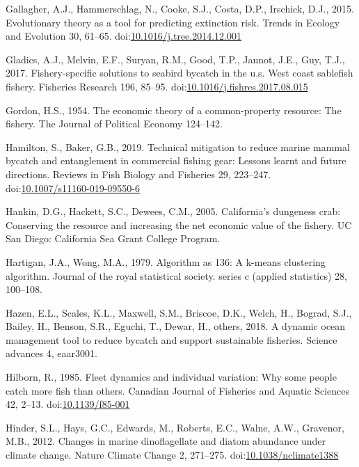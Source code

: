 \documentclass[]{elsarticle} %
\begin{document}
\leavevmode\hypertarget{ref-Gallagher2015}{}%
Gallagher, A.J., Hammerschlag, N., Cooke, S.J., Costa, D.P., Irschick,
D.J., 2015. Evolutionary theory as a tool for predicting extinction
risk. Trends in Ecology and Evolution 30, 61--65.
doi:\href{https://doi.org/10.1016/j.tree.2014.12.001}{10.1016/j.tree.2014.12.001}

\leavevmode\hypertarget{ref-Gladics2017}{}%
Gladics, A.J., Melvin, E.F., Suryan, R.M., Good, T.P., Jannot, J.E.,
Guy, T.J., 2017. Fishery-specific solutions to seabird bycatch in the
u.s. West coast sablefish fishery. Fisheries Research 196, 85--95.
doi:\href{https://doi.org/10.1016/j.fishres.2017.08.015}{10.1016/j.fishres.2017.08.015}

\leavevmode\hypertarget{ref-Gordon1954}{}%
Gordon, H.S., 1954. The economic theory of a common-property resource:
The fishery. The Journal of Political Economy 124--142.

\leavevmode\hypertarget{ref-Hamilton2019}{}%
Hamilton, S., Baker, G.B., 2019. Technical mitigation to reduce marine
mammal bycatch and entanglement in commercial fishing gear: Lessons
learnt and future directions. Reviews in Fish Biology and Fisheries 29,
223--247.
doi:\href{https://doi.org/10.1007/s11160-019-09550-6}{10.1007/s11160-019-09550-6}

\leavevmode\hypertarget{ref-Hankin2005}{}%
Hankin, D.G., Hackett, S.C., Dewees, C.M., 2005. California's dungeness
crab: Conserving the resource and increasing the net economic value of
the fishery. UC San Diego: California Sea Grant College Program.

\leavevmode\hypertarget{ref-Hartigan1979}{}%
Hartigan, J.A., Wong, M.A., 1979. Algorithm as 136: A k-means clustering
algorithm. Journal of the royal statistical society. series c (applied
statistics) 28, 100--108.

\leavevmode\hypertarget{ref-Hazen2018}{}%
Hazen, E.L., Scales, K.L., Maxwell, S.M., Briscoe, D.K., Welch, H.,
Bograd, S.J., Bailey, H., Benson, S.R., Eguchi, T., Dewar, H., others,
2018. A dynamic ocean management tool to reduce bycatch and support
sustainable fisheries. Science advances 4, eaar3001.

\leavevmode\hypertarget{ref-Hilborn1985}{}%
Hilborn, R., 1985. Fleet dynamics and individual variation: Why some
people catch more fish than others. Canadian Journal of Fisheries and
Aquatic Sciences 42, 2--13.
doi:\href{https://doi.org/10.1139/f85-001}{10.1139/f85-001}

\leavevmode\hypertarget{ref-Hinder2012}{}%
Hinder, S.L., Hays, G.C., Edwards, M., Roberts, E.C., Walne, A.W.,
Gravenor, M.B., 2012. Changes in marine dinoflagellate and diatom
abundance under climate change. Nature Climate Change 2, 271--275.
doi:\href{https://doi.org/10.1038/nclimate1388}{10.1038/nclimate1388}
\end{document}
